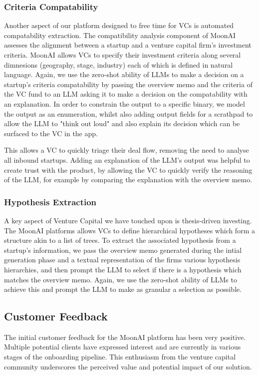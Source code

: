 \documentclass[a4paper, oneside]{discothesis}
\begin{document}
\subsubsection{Criteria Compatability}
Another aspect of our platform designed to free time for VCs is automated compatability extraction. The compatibility analysis component of MoonAI assesses the alignment between a startup and a venture capital firm's investment criteria. MoonAI allows VCs to specify their investment criteria along several dimnesions (geography, stage, industry) each of which is defined in natural language. Again, we use the zero-shot ability of LLMs to make a decision on a startup's criteria compatability by passing the overview memo and the criteria of the VC fund to an LLM asking it to make a decision on the compatability with an explanation. In order to constrain the output to a specific binary, we model the output as an enumeration, whilst also adding output fields for a scrathpad to allow the LLM to "think out loud" and also explain its decision which can be surfaced to the VC in the app. 

This allows a VC to quickly triage their deal flow, removing the need to analyse all inbound startups. Adding an explanation of the LLM's output was helpful to create trust with the product, by allowing the VC to quickly verify the reasoning of the LLM, for example by comparing the explanation with the overview memo. 

\subsubsection{Hypothesis Extraction}
A key aspect of Venture Capital we have touched upon is thesis-driven investing. The MoonAI platforms allows VCs to define hierarchical hypotheses which form a structure akin to a list of trees. To extract the associated hypothesis from a startup's information, we pass the overview memo generated during the intial generation phase and a textual representation of the firms various hypothesis hierarchies, and then prompt the LLM to select if there is a hypothesis which matches the overview memo. Again, we use the zero-shot  ability of LLMs to achieve this and prompt the LLM to make as granular a selection as possible. 

\subsection{Customer Feedback}

The initial customer feedback for the MoonAI platform has been very positive. Multiple potential clients have expressed interest and are currently in various stages of the onboarding pipeline. This enthusiasm from the venture capital community underscores the perceived value and potential impact of our solution.
\end{document}
